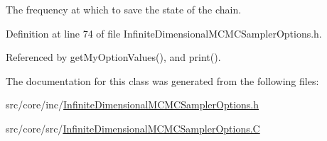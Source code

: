 The frequency at which to save the state of the chain. 



Definition at line 74 of file Infinite\-Dimensional\-M\-C\-M\-C\-Sampler\-Options.\-h.



Referenced by get\-My\-Option\-Values(), and print().



The documentation for this class was generated from the following files\-:\begin{DoxyCompactItemize}
\item 
src/core/inc/\hyperlink{_infinite_dimensional_m_c_m_c_sampler_options_8h}{Infinite\-Dimensional\-M\-C\-M\-C\-Sampler\-Options.\-h}\item 
src/core/src/\hyperlink{_infinite_dimensional_m_c_m_c_sampler_options_8_c}{Infinite\-Dimensional\-M\-C\-M\-C\-Sampler\-Options.\-C}\end{DoxyCompactItemize}
